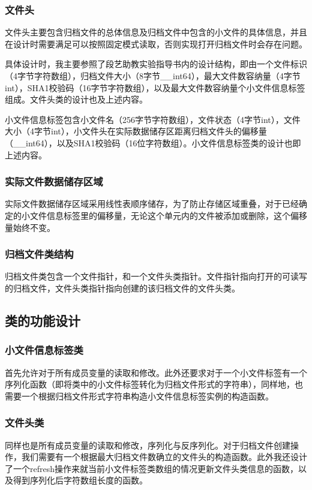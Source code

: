 \documentclass[11pt, a4paper]{article}
\begin{document}
\begin{CJK*}{UTF8}{gbsn}
			\subsubsection*{文件头}
				文件头主要包含归档文件的总体信息及归档文件中包含的小文件的具体信息，并且在设计时需要满足可以按照固定模式读取，否则实现打开归档文件时会存在问题。
				
				具体设计时，我主要参照了段艺助教实验指导书内的设计结构，即由一个文件标识（4字节字符数组），归档文件大小（8字节\_\_int64），最大文件数容纳量（4字节int），SHA1校验码（16字节字符数组），以及最大文件数容纳量个小文件信息标签组成。文件头类的设计也及上述内容。
				
				小文件信息标签包含小文件名（256字节字符数组），文件状态（4字节int），文件大小（4字节int），小文件头在实际数据储存区距离归档文件头的偏移量（\_\_int64），以及SHA1校验码（16位字符数组）。小文件信息标签类的设计也即上述内容。
				
			\subsubsection*{实际文件数据储存区域}
				实际文件数据储存区域采用线性表顺序储存，为了防止存储区域重叠，对于已经确定的小文件信息标签里的偏移量，无论这个单元内的文件被添加或删除，这个偏移量始终不变。
			\subsubsection*{归档文件类结构}
				归档文件类包含一个文件指针，和一个文件头类指针。文件指针指向打开的可读写的归档文件，文件头类指针指向创建的该归档文件的文件头类。
				
		\subsection{类的功能设计}
			\subsubsection*{小文件信息标签类}
				首先允许对于所有成员变量的读取和修改。此外还要求对于一个小文件标签有一个序列化函数（即将类中的小文件标签转化为归档文件形式的字符串），同样地，也需要一个根据归档文件形式字符串构造小文件信息标签实例的构造函数。
			\subsubsection*{文件头类}
				同样也是所有成员变量的读取和修改，序列化与反序列化。对于归档文件创建操作，我们需要有一个根据最大归档文件数确立的文件头的构造函数。此外我还设计了一个refresh操作来就当前小文件标签类数组的情况更新文件头类信息的函数，以及得到序列化后字符数组长度的函数。
				

\end{CJK*}
\end{document}
